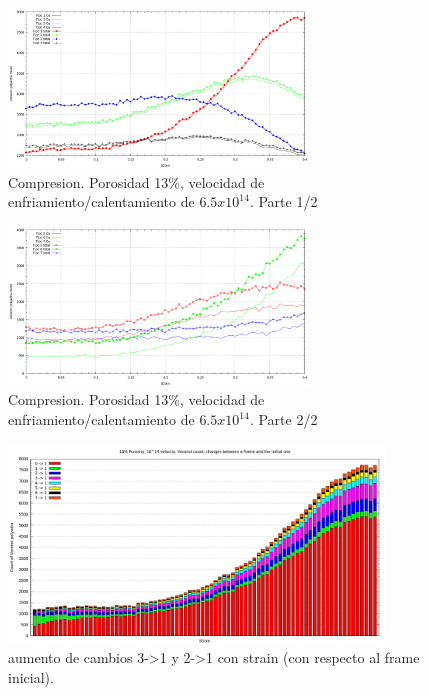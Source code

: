 \documentclass[10pt, oneside]{article} %
\begin{document}
\begin{figure}[H]
\centering
\includegraphics[width=8cm]{Figures/Porosidad/Porosidad_2vel_voronoi_13_14_comp.png}
\caption{Compresion. Porosidad 13\%, velocidad de enfriamiento/calentamiento de $6.5x10^{14}$. Parte 1/2}
\label{fg:8comp}
\end{figure}

\begin{figure}[H]
\centering
\includegraphics[width=8cm]{Figures/Porosidad/Porosidad_2vel_voronoi_13_14_comp2.png}
\caption{Compresion. Porosidad 13\%, velocidad de enfriamiento/calentamiento de $6.5x10^{14}$. Parte 2/2}
\label{fg:9comp}
\end{figure}

\begin{figure}[H]
\centering
\includegraphics[width=10cm]{Figures/Porosidad/Porosidad_2vel_comp_voronoi_hist1.png}
\caption{aumento de cambios 3->1 y 2->1 con strain (con respecto al frame inicial).}
\label{fg:10comp}
\end{figure}
\end{document}
